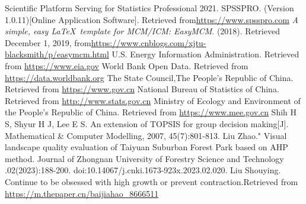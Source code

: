 \documentclass[12pt]{article}
\begin{document}
	\newpage
	
\begin{thebibliography}{99}
		 Scientific Platform Serving for Statistics Professional 2021. SPSSPRO. (Version 1.0.11)[Online Application Software]. Retrieved from\url{https://www.spsspro.com}
		 \emph{A simple, easy \LaTeX\ template for MCM/ICM: EasyMCM}. (2018). Retrieved December 1, 2019, from\url{https://www.cnblogs.com/xjtu-blacksmith/p/easymcm.html}
		 U.S. Energy Information Administration. Retrieved from \url{https://www.eia.gov}
		 World Bank Open Data. Retrieved from \url{https://data.worldbank.org}
		 The State Council,The People's Republic of China. Retrieved from \url{https://www.gov.cn}
		 National Bureau of Statistics of China. Retrieved from \url{http://www.stats.gov.cn}
		 Ministry of Ecology and Environment of the People's Republic of China. Retrieved from \url{https://www.mee.gov.cn}
		 Shih H S, Shyur H J, Lee E S. An extension of TOPSIS for group decision making[J]. Mathematical \& Computer Modelling, 2007, 45(7):801-813.
		 Liu Zhao." Visual landscape quality evaluation of Taiyuan Suburban Forest Park based on AHP method. Journal of Zhongnan University of Forestry Science and Technology .02(2023):188-200. doi:10.14067/j.cnki.1673-923x.2023.02.020.
		 Liu Shouying. Continue to be obsessed with high growth or prevent contraction.Retrieved from \url{https://m.thepaper.cn/baijiahao_8666511}
		
\end{thebibliography}
	
	
\end{document}
